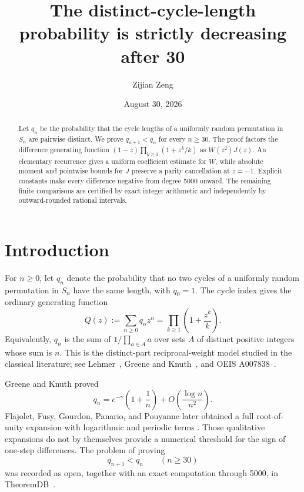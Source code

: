 \documentclass[11pt]{amsart}
\title[Distinct cycle lengths]{The distinct-cycle-length probability is strictly decreasing after 30}
\author{Zijian Zeng}
\date{August 30, 2026}
\theoremstyle{remark}
\begin{document}
\begin{abstract}
Let \(q_n\) be the probability that the cycle lengths of a uniformly random
permutation in \(S_n\) are pairwise distinct. We prove
\(q_{n+1}<q_n\) for every \(n\ge30\). The proof factors the difference
generating function \((1-z)\prod_{k\ge1}(1+z^k/k)\) as \(W(z^2)J(z)\).
An elementary recurrence gives a uniform coefficient estimate for \(W\),
while absolute moment and pointwise bounds for \(J\) preserve a parity
cancellation at \(z=-1\). Explicit constants make every difference negative
from degree 5000 onward. The remaining finite comparisons are certified by
exact integer arithmetic and independently by outward-rounded rational
intervals.
\end{abstract}

\maketitle

\section{Introduction}

For \(n\ge0\), let \(q_n\) denote the probability that no two cycles of a
uniformly random permutation in \(S_n\) have the same length, with \(q_0=1\).
The cycle index gives the ordinary generating function
\begin{equation}\label{eq:Q}
 Q(z):=\sum_{n\ge0}q_nz^n
 =\prod_{k\ge1}\left(1+\frac{z^k}{k}\right).
\end{equation}
Equivalently, \(q_n\) is the sum of \(1/\prod_{a\in A}a\) over sets \(A\)
of distinct positive integers whose sum is \(n\). This is the
distinct-part reciprocal-weight model studied in the classical literature;
see Lehmer~\cite{Lehmer1972}, Greene and Knuth~\cite{GreeneKnuth1981}, and
OEIS A007838~\cite{OEISA007838}.

Greene and Knuth proved
\[
 q_n=e^{-\gamma}\left(1+\frac1n\right)
      +O\!\left(\frac{\log n}{n^2}\right).
\]
Flajolet, Fusy, Gourdon, Panario, and Pouyanne later obtained a full
root-of-unity expansion with logarithmic and periodic terms
\cite[Section~3 and Proposition~1]{FlajoletEtAl2006}. Those qualitative
expansions do not by themselves provide a numerical threshold for the sign
of one-step differences. The problem of proving
\begin{equation}\label{eq:target}
 q_{n+1}<q_n\qquad(n\ge30)
\end{equation}
was recorded as open, together with an exact computation through 5000, in
TheoremDB~\cite{TheoremDBP2540}.
\end{document}
